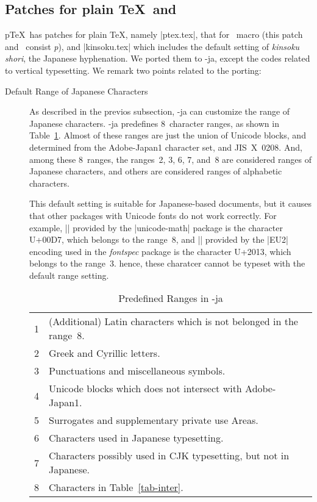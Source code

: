 \documentclass{ajt}
\begin{document}
\subsection{Patches for plain \TeX\ and \LaTeXe}
p\TeX\ has patches for plain \TeX, namely |ptex.tex|, that for \LaTeXe\
macro (this patch and \LaTeXe\ consist \emph{p\LaTeXe}), and
|kinsoku.tex| which includes the default setting of \emph{kinsoku
shori}, the Japanese hyphenation.  We ported them to \LuaTeX-ja, except
the codes related to vertical typesetting. We remark two points related to the porting:
\begin{description}
\item[Default Range of Japanese Characters] 
As described in the previos subsection, \LuaTeX-ja can customize the
range of Japanese characters.  \LuaTeX-ja predefines 8~character ranges,
as shown in Table~\ref{tab-chrrng}.  Almost of these ranges are just the
union of Unicode blocks, and determined from the Adobe-Japan1 character
set, and JIS~X~0208.  And, among these 8~ranges, the ranges~2, 3, 6, 7,
and~8 are considered ranges of Japanese characters, and others are
considered ranges of alphabetic characters.

This default setting is suitable for Japanese-based documents, but it
	   causes that other packages with Unicode fonts do not work
	   correctly. For example, |\times| provided by the
	   |unicode-math| package is the character U+00D7, which belongs
	   to the range~8, and |\textendash| provided by the |EU2|
	   encoding used in the \emph{fontspec} package is the
	   character U+2013, which belongs to the range~3. hence, these
	   charatcer cannot be typeset with the default range setting.

\begin{table}
\caption{Predefined Ranges in \LuaTeX-ja}
\label{tab-chrrng}
\begin{center}
\begin{tabular}{@{\bf}rl}
1&(Additional) Latin characters which is not belonged in the range~8.\\
2&Greek and Cyrillic letters.\\
3&Punctuations and miscellaneous symbols.\\
4&Unicode blocks which does not intersect with Adobe-Japan1.\\
5&Surrogates and supplementary private use Areas.\\
6&Characters used in Japanese typesetting.\\
7&Characters possibly used in CJK typesetting, but not in Japanese.\\
8&Characters in Table~\ref{tab-inter}.
\end{tabular}
\end{center}
\end{table}



\end{description}
\end{document}
